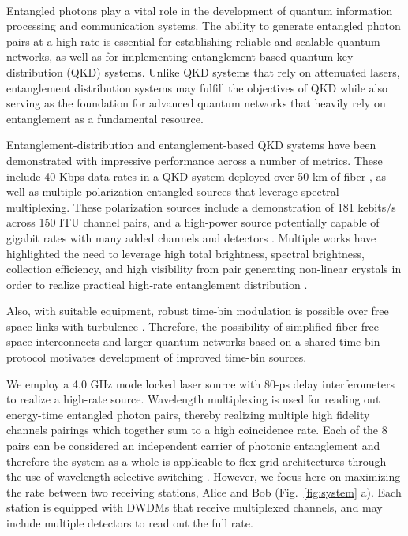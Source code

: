 \documentclass[11pt]{caltech_thesis} %
\begin{document}
~~~~~

Entangled photons play a vital role in the development of quantum information processing and communication systems. The ability to generate entangled photon pairs at a high rate is essential for establishing reliable and scalable quantum networks, as well as for implementing entanglement-based quantum key distribution (QKD) systems. Unlike QKD systems that rely on attenuated lasers, entanglement distribution systems may fulfill the objectives of QKD while also serving as the foundation for advanced quantum networks that heavily rely on entanglement as a fundamental resource.

Entanglement-distribution and entanglement-based QKD systems have been demonstrated with impressive performance across a number of metrics. These include 40 Kbps data rates in a QKD system deployed over 50 km of fiber \autocite{Pelet2022}, as well as multiple polarization entangled sources that leverage spectral multiplexing. These polarization sources include a demonstration of 181 kebits/s across 150 ITU channel pairs, and a high-power source potentially capable of gigabit rates with many added channels and detectors \autocite{Alshowkan2022,Neumann2022Entanglement}. Multiple works have highlighted the need to leverage high total brightness, spectral brightness, collection efficiency, and high visibility from pair generating non-linear crystals in order to realize practical high-rate entanglement distribution \autocite{Neumann2022Entanglement}.

Also, with suitable equipment, robust time-bin modulation is possible over free space links with turbulence \autocite{Jin2019}. Therefore, the possibility of simplified fiber-free space interconnects and larger quantum networks based on a shared time-bin protocol motivates development of improved time-bin sources.

We employ a 4.0 GHz mode locked laser source with 80-ps delay interferometers to realize a high-rate source. Wavelength multiplexing is used for reading out energy-time entangled photon pairs, thereby realizing multiple high fidelity channels pairings which together sum to a high coincidence rate. Each of the 8 pairs can be considered an independent carrier of photonic entanglement \autocite{Wengerowsky2018} and therefore the system as a whole is applicable to flex-grid architectures through the use of wavelength selective switching \autocite{Appas2021,Alshowkan22Switching}. However, we focus here on maximizing the rate between two receiving stations, Alice and Bob (Fig.~\ref{fig:system} a). Each station is equipped with DWDMs that receive multiplexed channels, and may include multiple detectors to read out the full rate.
\end{document}
